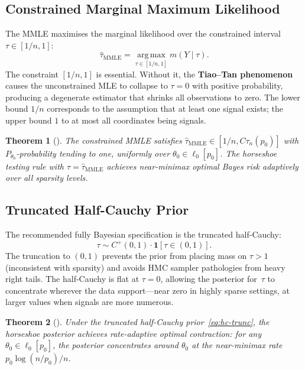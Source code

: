 \documentclass[12pt]{article}
\newtheorem{theorem}{Theorem}[section]
\begin{document}
\subsection{Constrained Marginal Maximum Likelihood}\label{sec:mmle}

The MMLE maximises the marginal likelihood over the constrained interval $\tau \in [1/n, 1]$:
\begin{equation}\label{eq:mmle}
  \hat{\tau}_{\mathrm{MMLE}} = \operatorname*{arg\,max}_{\tau \in [1/n, 1]} m(Y \mid \tau).
\end{equation}
The constraint $[1/n, 1]$ is essential. Without it, the \textbf{Tiao--Tan phenomenon} \citep{tiao1965bayesian} causes the unconstrained MLE to collapse to $\tau = 0$ with positive probability, producing a degenerate estimator that shrinks all observations to zero. The lower bound $1/n$ corresponds to the assumption that at least one signal exists; the upper bound $1$ to at most all coordinates being signals.

\begin{theorem}[\citet{vanderpas2017adaptive}]\label{thm:mmle}
The constrained MMLE satisfies $\hat{\tau}_{\mathrm{MMLE}} \in [1/n, C\tau_n(p_0)]$ with $P_{\theta_0}$-probability tending to one, uniformly over $\theta_0 \in \ell_0[p_0]$. The horseshoe testing rule with $\tau = \hat{\tau}_{\mathrm{MMLE}}$ achieves near-minimax optimal Bayes risk adaptively over all sparsity levels.
\end{theorem}

\subsection{Truncated Half-Cauchy Prior}\label{sec:hc-prior}

The recommended fully Bayesian specification is the truncated half-Cauchy:
\begin{equation}\label{eq:hc-trunc}
  \tau \sim C^+(0,1) \cdot \mathbf{1}[\tau \in (0,1)].
\end{equation}
The truncation to $(0,1)$ prevents the prior from placing mass on $\tau > 1$ (inconsistent with sparsity) and avoids HMC sampler pathologies from heavy right tails. The half-Cauchy is flat at $\tau = 0$, allowing the posterior for~$\tau$ to concentrate wherever the data support---near zero in highly sparse settings, at larger values when signals are more numerous.

\begin{theorem}[\citet{vanderpas2017adaptive}]\label{thm:adaptive}
Under the truncated half-Cauchy prior~\eqref{eq:hc-trunc}, the horseshoe posterior achieves rate-adaptive optimal contraction: for any $\theta_0 \in \ell_0[p_0]$, the posterior concentrates around $\theta_0$ at the near-minimax rate $p_0\log(n/p_0)/n$.
\end{theorem}
\end{document}
